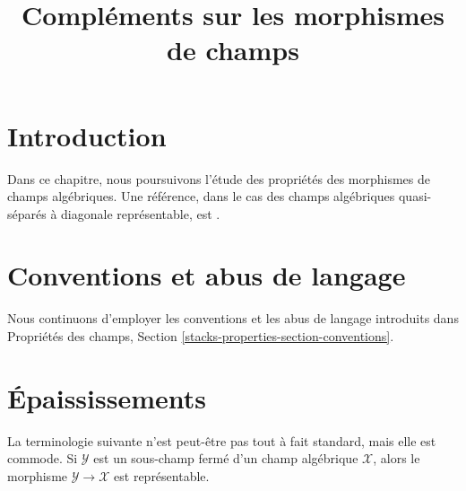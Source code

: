 

%


\title{Compléments sur les morphismes de champs}


\maketitle

\label{section-phantom}

\tableofcontents

\section{Introduction}
\label{section-introduction}

\noindent
Dans ce chapitre, nous poursuivons l'étude des propriétés des morphismes de
champs algébriques. Une référence, dans le cas des champs algébriques quasi-séparés
à diagonale représentable, est \cite{LM-B}.




\section{Conventions et abus de langage}
\label{section-conventions}

\noindent
Nous continuons d'employer les conventions et les abus de langage
introduits dans
Propriétés des champs, Section \ref{stacks-properties-section-conventions}.






\section{Épaississements}
\label{section-thickenings}

\noindent
La terminologie suivante n'est peut-être pas tout à fait standard, mais elle est commode.
Si $\mathcal{Y}$ est un sous-champ fermé d'un champ algébrique $\mathcal{X}$,
alors le morphisme $\mathcal{Y} \to \mathcal{X}$ est représentable.

